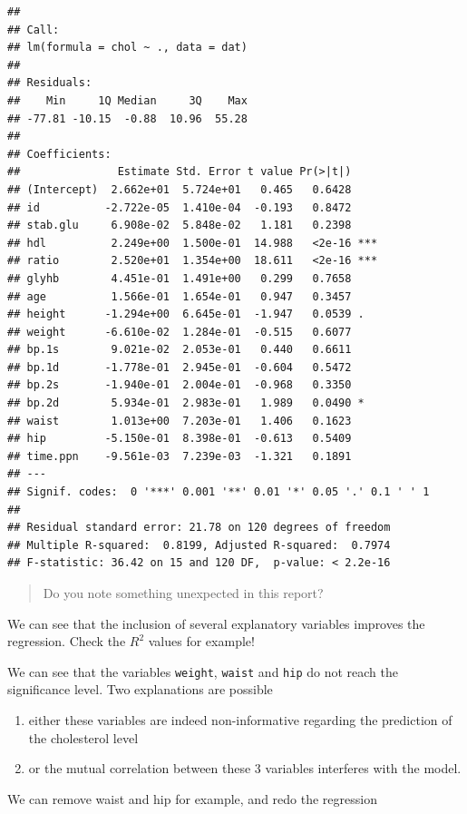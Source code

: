 \documentclass[
]{book}
\providecommand{\tightlist}{%
  \setlength{\itemsep}{0pt}\setlength{\parskip}{0pt}}
\begin{document}
\begin{verbatim}
## 
## Call:
## lm(formula = chol ~ ., data = dat)
## 
## Residuals:
##    Min     1Q Median     3Q    Max 
## -77.81 -10.15  -0.88  10.96  55.28 
## 
## Coefficients:
##               Estimate Std. Error t value Pr(>|t|)    
## (Intercept)  2.662e+01  5.724e+01   0.465   0.6428    
## id          -2.722e-05  1.410e-04  -0.193   0.8472    
## stab.glu     6.908e-02  5.848e-02   1.181   0.2398    
## hdl          2.249e+00  1.500e-01  14.988   <2e-16 ***
## ratio        2.520e+01  1.354e+00  18.611   <2e-16 ***
## glyhb        4.451e-01  1.491e+00   0.299   0.7658    
## age          1.566e-01  1.654e-01   0.947   0.3457    
## height      -1.294e+00  6.645e-01  -1.947   0.0539 .  
## weight      -6.610e-02  1.284e-01  -0.515   0.6077    
## bp.1s        9.021e-02  2.053e-01   0.440   0.6611    
## bp.1d       -1.778e-01  2.945e-01  -0.604   0.5472    
## bp.2s       -1.940e-01  2.004e-01  -0.968   0.3350    
## bp.2d        5.934e-01  2.983e-01   1.989   0.0490 *  
## waist        1.013e+00  7.203e-01   1.406   0.1623    
## hip         -5.150e-01  8.398e-01  -0.613   0.5409    
## time.ppn    -9.561e-03  7.239e-03  -1.321   0.1891    
## ---
## Signif. codes:  0 '***' 0.001 '**' 0.01 '*' 0.05 '.' 0.1 ' ' 1
## 
## Residual standard error: 21.78 on 120 degrees of freedom
## Multiple R-squared:  0.8199, Adjusted R-squared:  0.7974 
## F-statistic: 36.42 on 15 and 120 DF,  p-value: < 2.2e-16
\end{verbatim}

\begin{quote}
Do you note something unexpected in this report?
\end{quote}

We can see that the inclusion of several explanatory variables improves the regression. Check the \(R^2\) values for example!

We can see that the variables \texttt{weight}, \texttt{waist} and \texttt{hip} do not reach the significance level. Two explanations are possible

\begin{enumerate}
\def\labelenumi{\arabic{enumi}.}
\tightlist
\item
  either these variables are indeed non-informative regarding the prediction of the cholesterol level
\item
  or the mutual correlation between these 3 variables interferes with the model.
\end{enumerate}

We can remove waist and hip for example, and redo the regression
\end{document}
